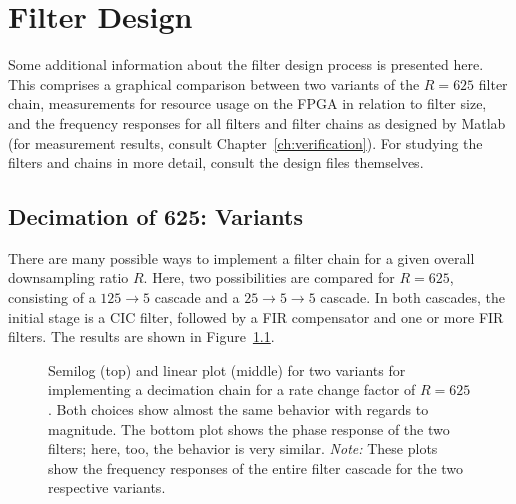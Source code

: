 %
%
\chapter{Filter Design} %
\label{ch:app:fdesign}

Some  additional information  about  the filter  design  process is  presented
here. This  comprises  a graphical  comparison  between  two variants  of  the
$R=625$  filter  chain,  measurements  for  resource  usage  on  the  FPGA  in
relation  to filter  size, and  the frequency  responses for  all filters  and
filter  chains  as  designed  by  Matlab  (for  measurement  results,  consult
Chapter~\ref{ch:verification}). For studying  the filters  and chains  in more
detail, consult the design files themselves.

%
%
\section{Decimation of 625: Variants} %
\label{sec:dec625_variants}

There are many possible  ways to implement a filter chain  for a given overall
downsampling  ratio $R$. Here,  two  possibilities are  compared for  $R=625$,
consisting  of  a  $125  \rightarrow  5$  cascade  and  a  $25  \rightarrow  5
\rightarrow 5$ cascade. In  both cascades, the initial stage is  a CIC filter,
followed by  a FIR compensator  and one or  more FIR filters. The  results are
shown in Figure~\ref{fig:dec625_variants}.

\begin{figure}
    \centering
    
    \caption[Decimation Chain Variants for Rate of 625]{%
        Semilog  (top)  and   linear  plot  (middle)  for   two  variants  for
        implementing  a  decimation   chain  for  a  rate   change  factor  of
        $R=625$. Both choices  show almost the  same behavior with  regards to
        magnitude. The  bottom  plot  shows  the phase  response  of  the  two
        filters; here, too, the behavior  is very similar. \emph{Note:}  These
        plots show  the frequency responses  of the entire filter  cascade for
        the two respective variants.%
    }
    \label{fig:dec625_variants}
\end{figure}

